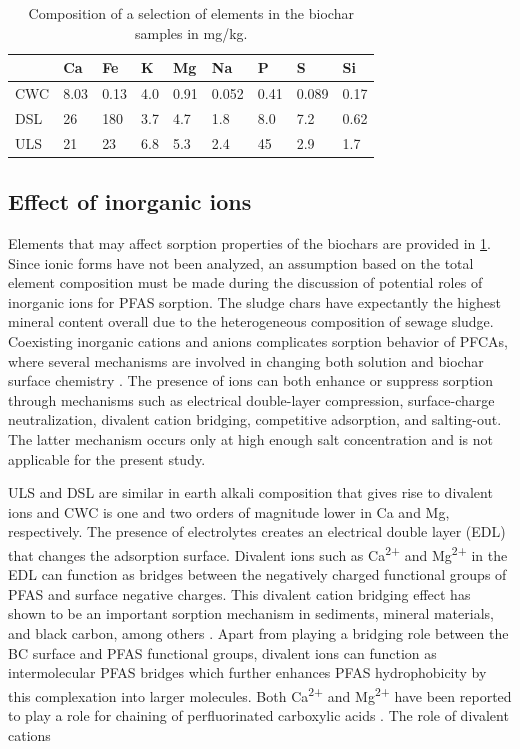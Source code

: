 \begin{table}
\centering
\caption{Composition of a selection of elements in the biochar samples in mg/kg.}
\label{tab:BC_mainElements}
\begin{tabular}{lllllllll} \toprule
 & Ca & Fe & K & Mg & Na & P & S & Si \\ \midrule
CWC & 8.03 & 0.13 & 4.0 & 0.91 & 0.052 & 0.41 & 0.089 & 0.17 \\
DSL & 26 & 180 & 3.7 & 4.7 & 1.8 & 8.0 & 7.2 & 0.62 \\
ULS & 21 & 23 & 6.8 & 5.3 & 2.4 & 45 & 2.9 & 1.7 \\ \bottomrule
\end{tabular}
\end{table}

\subsection{Effect of inorganic ions}
Elements that may affect sorption properties of the biochars are provided in \cref{tab:BC_mainElements}. Since ionic forms have not been analyzed, an assumption based on the total element composition must be made during the discussion of potential roles of inorganic ions for PFAS sorption. The sludge chars have expectantly the highest mineral content overall due to the heterogeneous composition of sewage sludge. 
Coexisting inorganic cations and anions complicates sorption behavior of PFCAs, where several mechanisms are involved in changing both solution and biochar surface chemistry \citep{du2014adsorption}. The presence of ions can both enhance or suppress sorption through mechanisms such as electrical double-layer compression, surface-charge neutralization, divalent cation bridging, competitive adsorption, and salting-out. The latter mechanism occurs only at high enough salt concentration and is not applicable for the present study. 

ULS and DSL are similar in earth alkali composition that gives rise to divalent ions  and CWC is one and two orders of magnitude lower in Ca and Mg, respectively. The presence of electrolytes creates an electrical double layer (EDL) that changes the adsorption surface. Divalent ions such as Ca\textsuperscript{2+} and Mg\textsuperscript{2+} in the EDL can function as bridges between the negatively charged functional groups of PFAS and surface negative charges. This divalent cation bridging effect has shown to be an important sorption mechanism in sediments, mineral materials, and black carbon, among others \citep{higgins2006sorption}. Apart from playing a bridging role between the BC surface and PFAS functional groups, divalent ions can function as intermolecular PFAS bridges which further enhances PFAS hydrophobicity by this complexation into larger molecules. Both Ca\textsuperscript{2+} and Mg\textsuperscript{2+} have been reported to play a role for chaining of perfluorinated carboxylic acids \citep{wang2011}. The role of divalent cations  

